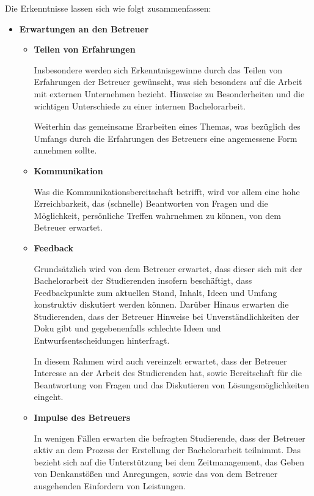 \documentclass{scrreprt}
\begin{document}
\par\medskip Die Erkenntnisse lassen sich wie folgt zusammenfassen:
\begin{itemize}

\item \textbf{Erwartungen an den Betreuer}
\begin{itemize}

\item \textbf{Teilen von Erfahrungen}
\par Insbesondere werden sich Erkenntnisgewinne durch das Teilen von Erfahrungen der Betreuer gewünscht, was sich besonders auf die Arbeit mit externen Unternehmen bezieht. Hinweise zu Besonderheiten und die wichtigen Unterschiede zu einer internen Bachelorarbeit. 
\par Weiterhin das gemeinsame Erarbeiten eines Themas, was bezüglich des Umfangs durch die Erfahrungen des Betreuers eine angemessene Form annehmen sollte.

\item \textbf{Kommunikation}
\par Was die Kommunikationsbereitschaft betrifft, wird vor allem eine hohe Erreichbarkeit, das (schnelle) Beantworten von Fragen und die Möglichkeit, persönliche Treffen wahrnehmen zu können, von dem Betreuer erwartet.

\item \textbf{Feedback}
\par Grundsätzlich wird von dem Betreuer erwartet, dass dieser sich mit der Bachelorarbeit der Studierenden insofern beschäftigt, dass Feedbackpunkte zum aktuellen Stand, Inhalt, Ideen und Umfang konstruktiv diskutiert werden können. Darüber Hinaus erwarten die Studierenden, dass der Betreuer Hinweise bei Unverständlichkeiten der Doku gibt und gegebenenfalls schlechte Ideen und Entwurfsentscheidungen hinterfragt.
\par In diesem Rahmen wird auch vereinzelt erwartet, dass der Betreuer Interesse an der Arbeit des Studierenden hat, sowie Bereitschaft für die Beantwortung von Fragen und das Diskutieren von Lösungsmöglichkeiten eingeht.

\item \textbf{Impulse des Betreuers}
\par In wenigen Fällen erwarten die befragten Studierende, dass der Betreuer aktiv an dem Prozess der Erstellung der Bachelorarbeit teilnimmt. Das bezieht sich auf die Unterstützung bei dem Zeitmanagement, das Geben von Denkanstößen und Anregungen, sowie das von dem Betreuer ausgehenden Einfordern von Leistungen.
\end{itemize}


\end{itemize}
\end{document}
